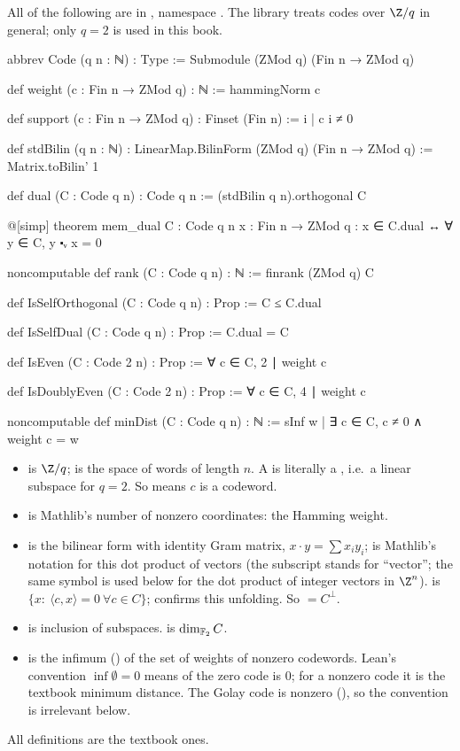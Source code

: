 All of the following are in , namespace
.  The library treats codes over $\Z/q$ in general; only $q=2$ is used in this book.
\begin{leancode}
abbrev Code (q n : ℕ) : Type := Submodule (ZMod q) (Fin n → ZMod q)

def weight (c : Fin n → ZMod q) : ℕ := hammingNorm c

def support (c : Fin n → ZMod q) : Finset (Fin n) := {i | c i ≠ 0}

def stdBilin (q n : ℕ) : LinearMap.BilinForm (ZMod q) (Fin n → ZMod q) := Matrix.toBilin' 1

def dual (C : Code q n) : Code q n := (stdBilin q n).orthogonal C

@[simp] theorem mem_dual {C : Code q n} {x : Fin n → ZMod q} :
    x ∈ C.dual ↔ ∀ y ∈ C, y ⬝ᵥ x = 0

noncomputable def rank (C : Code q n) : ℕ := finrank (ZMod q) C

def IsSelfOrthogonal (C : Code q n) : Prop := C ≤ C.dual

def IsSelfDual (C : Code q n) : Prop := C.dual = C

def IsEven (C : Code 2 n) : Prop := ∀ c ∈ C, 2 ∣ weight c

def IsDoublyEven (C : Code 2 n) : Prop := ∀ c ∈ C, 4 ∣ weight c

noncomputable def minDist (C : Code q n) : ℕ := sInf {w | ∃ c ∈ C, c ≠ 0 ∧ weight c = w}
\end{leancode}
\begin{dictionary}
\begin{itemize}
\item {} is $\Z/q$;  is the space of words of length $n$.  A
   is literally a , i.e.\ a linear subspace for $q=2$.  So
   means $c$ is a codeword.
\item {} is Mathlib's number of nonzero coordinates: the Hamming weight.
\item {} is the bilinear form with identity Gram matrix, $x\cdot y=\sum
  x_iy_i$;  is Mathlib's notation for this dot product of vectors (the subscript
 stands for ``vector''; the same symbol is used below for the dot product of integer
vectors in $\Z^n$).
   is $\{x:\ \langle c,x\rangle=0\ \forall c\in C\}$;  confirms
  this unfolding.  So  $=C^\perp$.
\item {} is inclusion of subspaces.   is $\dim_{\mathbb{F}_2}C$.
\item {} is the infimum () of the set of weights of nonzero codewords.
  Lean's convention $\inf\emptyset=0$ means  of the zero code is $0$; for a nonzero
  code it is the textbook minimum distance.  The Golay code is nonzero
  (), so the convention is irrelevant below.
\end{itemize}
All definitions are the textbook ones.
\end{dictionary}

